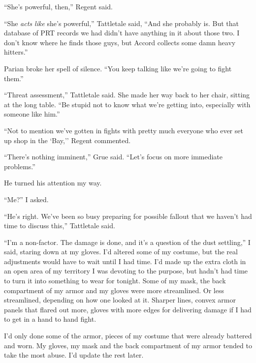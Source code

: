 ``She's powerful, then,'' Regent said.



``She \emph{acts like} she's powerful,'' Tattletale said, ``And she probably is.  But that database of PRT records we had didn't have anything in it about those two.  I don't know where he finds those guys, but Accord collects some damn heavy hitters.''



Parian broke her spell of silence.  ``You keep talking like we're going to fight them.''



``Threat assessment,'' Tattletale said.  She made her way back to her chair, sitting at the long table.  ``Be stupid not to know what we're getting into, especially with someone like him.''



``Not to mention we've gotten in fights with pretty much everyone who ever set up shop in the `Bay,'' Regent commented.



``There's nothing imminent,'' Grue said.  ``Let's focus on more immediate problems.''



He turned his attention my way.



``Me?'' I asked.



``He's right.  We've been so busy preparing for possible fallout that we haven't had time to discuss this,'' Tattletale said.



``I'm a non-factor.  The damage is done, and it's a question of the dust settling,'' I said, staring down at my gloves.  I'd altered some of my costume, but the real adjustments would have to wait until I had time.  I'd made up the extra cloth in an open area of my territory I was devoting to the purpose, but hadn't had time to turn it into something to wear for tonight.  Some of my mask, the back compartment of my armor and my gloves were more streamlined.  Or less streamlined, depending on how one looked at it.  Sharper lines, convex armor panels that flared out more, gloves with more edges for delivering damage if I had to get in a hand to hand fight.



I'd only done some of the armor, pieces of my costume that were already battered and worn.  My gloves, my mask and the back compartment of my armor tended to take the most abuse.  I'd update the rest later.




